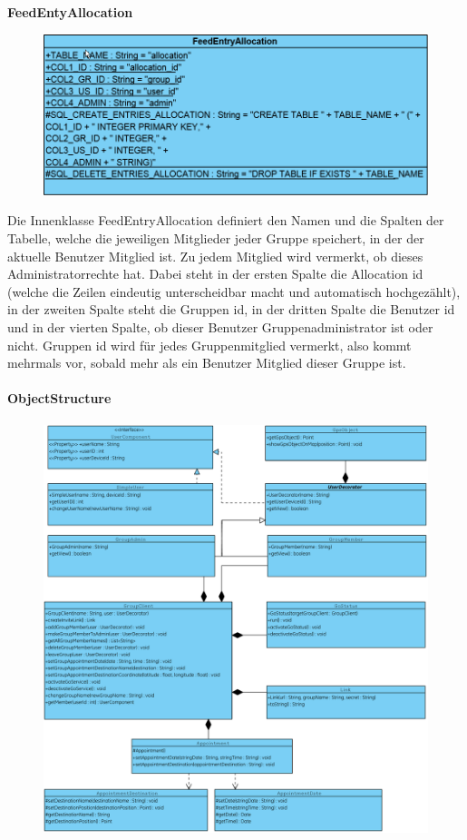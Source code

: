 \textbf{FeedEntyAllocation}
\begin{figure}[H]
	\includegraphics[scale = .5]{res/umlClasses/FeedEntryAllocation.png}
	\centering
\end{figure}
Die Innenklasse FeedEntryAllocation definiert den Namen und die Spalten der Tabelle, welche die jeweiligen Mitglieder jeder Gruppe speichert, in der der aktuelle Benutzer Mitglied ist. Zu jedem Mitglied wird vermerkt, ob dieses Administratorrechte hat.
Dabei steht in der ersten Spalte die Allocation id (welche die Zeilen eindeutig unterscheidbar macht und automatisch hochgezählt), in der zweiten Spalte steht die Gruppen id, in der dritten Spalte die Benutzer id und in der vierten Spalte, ob dieser Benutzer Gruppenadministrator ist oder nicht. 
Gruppen id wird für jedes Gruppenmitglied vermerkt, also kommt mehrmals vor, sobald mehr als ein Benutzer Mitglied dieser Gruppe ist.


\paragraph{ObjectStructure}

\begin{figure}[H]
	\includegraphics[scale = .5]{res/umlDiagramms/modelClientObjectStructure.pdf}
	\centering	
\end{figure}

